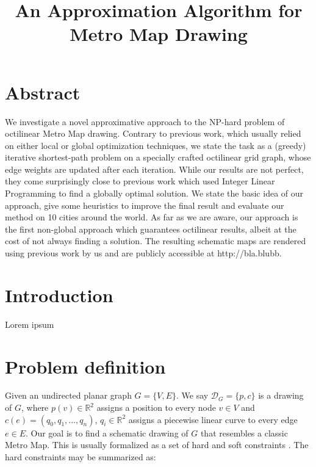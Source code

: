\documentclass{sig-alternate-sigmod09}
\begin{document}
\title{An Approximation Algorithm for Metro Map Drawing}


\maketitle

\section{Abstract}

We investigate a novel approximative approach to the NP-hard problem of octilinear Metro Map drawing. Contrary to previous work, which usually relied on either local or global optimization techniques, we state the task as a (greedy) iterative shortest-path problem on a specially crafted octilinear grid graph, whose edge weights are updated after each iteration. While our results are not perfect, they come surprisingly close to previous work which used Integer Linear Programming to find a globally optimal solution. We state the basic idea of our approach, give some heuristics to improve the final result and evaluate our method on 10 cities around the world. As far as we are aware, our approach is the first non-global approach which guarantees octilinear results, albeit at the cost of not always finding a solution. The resulting schematic maps are rendered using previous work by us and are publicly accessible at http://bla.blubb. 

\section{Introduction}

Lorem ipsum 

\section{Problem definition}

Given an undirected planar graph $G = \{V, E\}$. We say $\mathcal{D}_G = \{p, c\}$ is a drawing of $G$, where $p(v) \in \mathbb{R}^2$ assigns a position to every node $v \in V$ and $c(e) = (q_0, q_1, ..., q_n)$, $q_i \in \mathbb{R}^2$ assigns a piecewise linear curve to every edge $e \in E$. Our goal is to find a schematic drawing of $G$ that resembles a classic Metro Map. This is usually formalized as a set of hard and soft constraints \cite{nb, ...}. The hard constraints may be summarized as:
\end{document}
